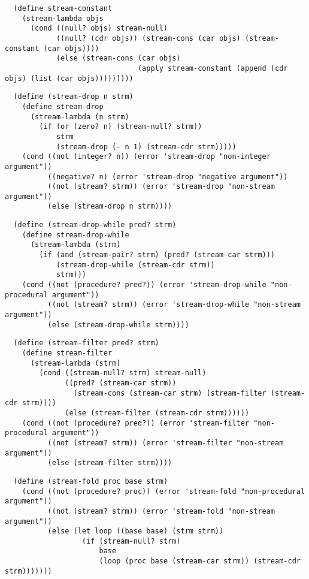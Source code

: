 \begin{verbatim}
  (define stream-constant
    (stream-lambda objs
      (cond ((null? objs) stream-null)
            ((null? (cdr objs)) (stream-cons (car objs) (stream-constant (car objs))))
            (else (stream-cons (car objs)
                               (apply stream-constant (append (cdr objs) (list (car objs)))))))))
\end{verbatim}

\begin{verbatim}
  (define (stream-drop n strm)
    (define stream-drop
      (stream-lambda (n strm)
        (if (or (zero? n) (stream-null? strm))
            strm
            (stream-drop (- n 1) (stream-cdr strm)))))
    (cond ((not (integer? n)) (error 'stream-drop "non-integer argument"))
          ((negative? n) (error 'stream-drop "negative argument"))
          ((not (stream? strm)) (error 'stream-drop "non-stream argument"))
          (else (stream-drop n strm))))
\end{verbatim}

\begin{verbatim}
  (define (stream-drop-while pred? strm)
    (define stream-drop-while
      (stream-lambda (strm)
        (if (and (stream-pair? strm) (pred? (stream-car strm)))
            (stream-drop-while (stream-cdr strm))
            strm)))
    (cond ((not (procedure? pred?)) (error 'stream-drop-while "non-procedural argument"))
          ((not (stream? strm)) (error 'stream-drop-while "non-stream argument"))
          (else (stream-drop-while strm))))
\end{verbatim}

\begin{verbatim}
  (define (stream-filter pred? strm)
    (define stream-filter
      (stream-lambda (strm)
        (cond ((stream-null? strm) stream-null)
              ((pred? (stream-car strm))
                (stream-cons (stream-car strm) (stream-filter (stream-cdr strm))))
              (else (stream-filter (stream-cdr strm))))))
    (cond ((not (procedure? pred?)) (error 'stream-filter "non-procedural argument"))
          ((not (stream? strm)) (error 'stream-filter "non-stream argument"))
          (else (stream-filter strm))))
\end{verbatim}

\begin{verbatim}
  (define (stream-fold proc base strm)
    (cond ((not (procedure? proc)) (error 'stream-fold "non-procedural argument"))
          ((not (stream? strm)) (error 'stream-fold "non-stream argument"))
          (else (let loop ((base base) (strm strm))
                  (if (stream-null? strm)
                      base
                      (loop (proc base (stream-car strm)) (stream-cdr strm)))))))
\end{verbatim}

